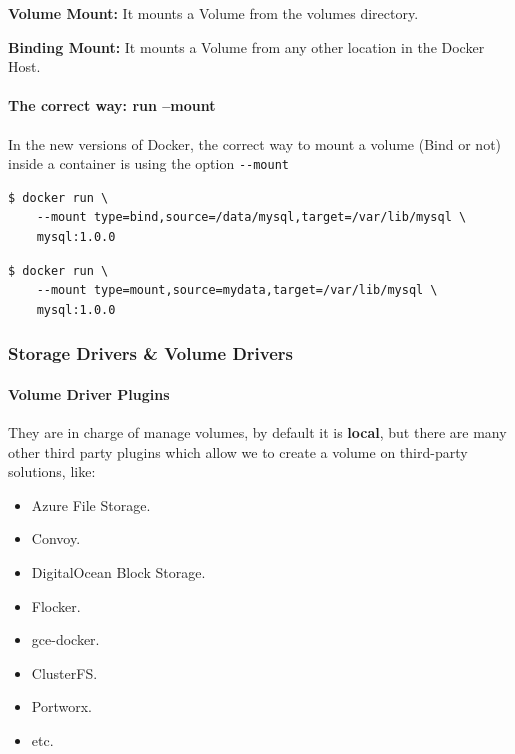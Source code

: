 \documentclass{article}
\newenvironment{blocktemplateI}[1]{%
    \tcolorbox[beamer,%
    noparskip,breakable,
    colframe=Violet,%
    colbacklower=Black,%
    title=#1]}%
    {\endtcolorbox}
\newenvironment{codetemplate}[1][]{%
  \mybasecolorbox[#1]
  \itshape
}{%
  \endmybasecolorbox
}
\begin{document}
\textbf{Volume Mount:} It mounts a Volume from the volumes directory.

\textbf{Binding Mount:} It mounts a Volume from any other location in the Docker Host.

\paragraph{The correct way: run --mount}

\begin{blocktemplateI}{NOTE}
In the new versions of Docker, the correct way to mount a volume (Bind or not) inside a container is using the option \verb|--mount|
\begin{codetemplate}{}
\begin{verbatim}
$ docker run \
    --mount type=bind,source=/data/mysql,target=/var/lib/mysql \ 
    mysql:1.0.0
\end{verbatim}
\end{codetemplate}
\begin{codetemplate}{}
\begin{verbatim}
$ docker run \
    --mount type=mount,source=mydata,target=/var/lib/mysql \ 
    mysql:1.0.0
\end{verbatim}
\end{codetemplate}
\end{blocktemplateI}

\subsubsection{Storage Drivers \& Volume Drivers}

\paragraph{Volume Driver Plugins}
They are in charge of manage volumes, by default it is \textbf{local}, but there are many other third party plugins which allow we to create a volume on third-party solutions, like:
\begin{itemize}
    \item Azure File Storage.
    \item Convoy.
    \item DigitalOcean Block Storage.
    \item Flocker.
    \item gce-docker.
    \item ClusterFS.
    \item Portworx.
    \item etc.
\end{itemize}
\end{document}
